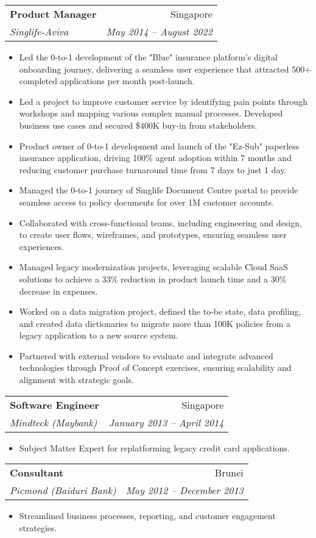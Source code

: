 \documentclass[letterpaper,11pt]{article}
\makeatletter
\newcommand{\resumeSubheading}[4]{
  \vspace{-1pt}\item
    \begin{tabular*}{0.97\textwidth}[t]{l@{\extracolsep{\fill}}r}
      \textbf{#1} & #2 \\
      \textit{\small#3} & \textit{\small #4} \\
    \end{tabular*}\vspace{-5pt}
}
\newcommand{\resumeItemListStart}{\begin{itemize}}
\newcommand{\resumeItemListEnd}{\end{itemize}\vspace{-5pt}}
\makeatother
\begin{document}
    \resumeSubheading
      {Product Manager}{Singapore}
      {Singlife-Aviva}{May 2014 -- August 2022}
      \resumeItemListStart
        \item\small{Led the 0-to-1 development of the "Blue" insurance platform's digital onboarding journey, delivering a seamless user experience that attracted 500+ completed applications per month post-launch.}
        \item\small{Led a project to improve customer service by identifying pain points through workshops and mapping various complex manual processes. Developed business use cases and secured \$400K buy-in from stakeholders.}
        \item\small{Product owner of 0-to-1 development and launch of the "Ez-Sub" paperless insurance application, driving 100\% agent adoption within 7 months and reducing customer purchase turnaround time from 7 days to just 1 day.}
        \item\small{Managed the 0-to-1 journey of Singlife Document Centre portal to provide seamless access to policy documents for over 1M customer accounts.}
        \item\small{Collaborated with cross-functional teams, including engineering and design, to create user flows, wireframes, and prototypes, ensuring seamless user experiences.}
        \item\small{Managed legacy modernization projects, leveraging scalable Cloud SaaS solutions to achieve a 33\% reduction in product launch time and a 30\% decrease in expenses.}
        \item\small{Worked on a data migration project, defined the to-be state, data profiling, and created data dictionaries to migrate more than 100K policies from a legacy application to a new source system.}
        \item\small{Partnered with external vendors to evaluate and integrate advanced technologies through Proof of Concept exercises, ensuring scalability and alignment with strategic goals.}
      \resumeItemListEnd

    \resumeSubheading
      {Software Engineer}{Singapore}
      {Mindteck (Maybank)}{January 2013 -- April 2014}
      \resumeItemListStart
        \item\small{Subject Matter Expert for replatforming legacy credit card applications.}
      \resumeItemListEnd

    \resumeSubheading
      {Consultant}{Brunei}
      {Picmond (Baiduri Bank)}{May 2012 -- December 2013}
      \resumeItemListStart
        \item\small{Streamlined business processes, reporting, and customer engagement strategies.}
      \resumeItemListEnd
\end{document}
